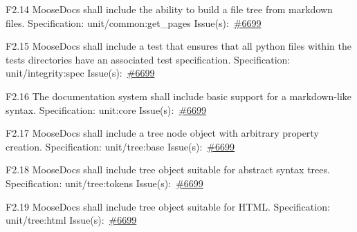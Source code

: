 \begin{Requirement}{F2.14}
MooseDocs shall include the ability to build a file tree from markdown files.
\newline
Specification: unit/common:get\_pages
\newline
Issue(s):~\href{https://github.com/idaholab/moose/issues/6699}{\#6699}
\end{Requirement}

\begin{Requirement}{F2.15}
MooseDocs shall include a test that ensures that all python files within the tests directories have an associated test specification.
\newline
Specification: unit/integrity:spec
\newline
Issue(s):~\href{https://github.com/idaholab/moose/issues/6699}{\#6699}
\end{Requirement}

\begin{Requirement}{F2.16}
The documentation system shall include basic support for a markdown-like syntax.
\newline
Specification: unit:core
\newline
Issue(s):~\href{https://github.com/idaholab/moose/issues/6699}{\#6699}
\end{Requirement}

\begin{Requirement}{F2.17}
MooseDocs shall include a tree node object with arbitrary property creation.
\newline
Specification: unit/tree:base
\newline
Issue(s):~\href{https://github.com/idaholab/moose/issues/6699}{\#6699}
\end{Requirement}

\begin{Requirement}{F2.18}
MooseDocs shall include tree object suitable for abstract syntax trees.
\newline
Specification: unit/tree:tokens
\newline
Issue(s):~\href{https://github.com/idaholab/moose/issues/6699}{\#6699}
\end{Requirement}

\begin{Requirement}{F2.19}
MooseDocs shall include tree object suitable for HTML.
\newline
Specification: unit/tree:html
\newline
Issue(s):~\href{https://github.com/idaholab/moose/issues/6699}{\#6699}
\end{Requirement}

